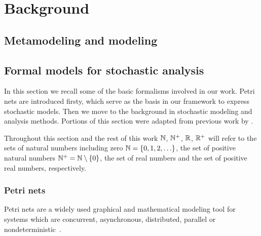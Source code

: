\chapter{Background}
\label{chap:background}

\section{Metamodeling and modeling}

\todo*{}

\section{Formal models for stochastic analysis}

In this section we recall some of the basic formalisms involved in our work. Petri nets are introduced firsty, which serve as the basis in our framework to express stochastic models. Then we move to the background in stochastic modeling and analysis methods. Portions of this section were adapted from previous work by \citet[Chapter~2]{Klenik15configurable}.

Throughout this section and the rest of this work \(\mathbb{N}\), \(\mathbb{N}^{+}\), \(\mathbb{R}\), \(\mathbb{R}^{+}\) will refer to the sets of natural numbers including zero \(\mathbb{N} = \{0, 1, 2, \ldots\}\), the set of positive natural numbers \(\mathbb{N}^{+} = \mathbb{N} \setminus \{0\}\), the set of real numbers and the set of positive real numbers, respectively.

\subsection{Petri nets}
\label{ssec:background:petri-nets}

Petri nets are a widely used graphical and mathematical modeling tool for systems which are concurrent, asynchronous, distributed, parallel or nondeterministic~\citep{Murata89petri}.

